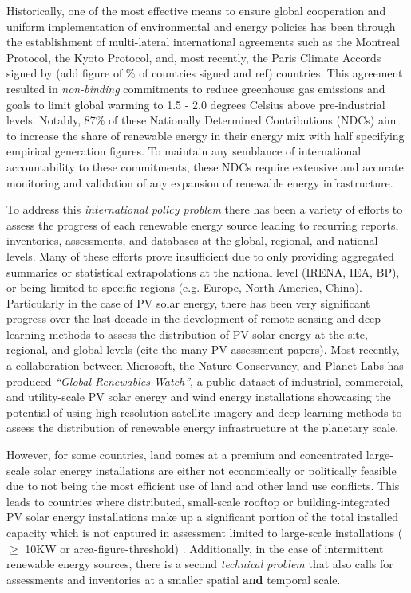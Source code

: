 \begin{multicols}{2}
Historically, one of the most effective means to ensure global cooperation and uniform implementation of environmental and energy policies has been through the establishment of multi-lateral international agreements such as the Montreal Protocol, the Kyoto Protocol, and, most recently, the Paris Climate Accords signed by (add figure of \% of countries signed and ref) countries. This agreement resulted in \textit{non-binding} commitments to reduce greenhouse gas emissions and goals to 
limit global warming to 1.5 - 2.0 degrees Celsius above pre-industrial levels. Notably, 87\% of these Nationally Determined Contributions (NDCs) aim to increase the share of renewable energy in their energy mix with half specifying empirical generation figures\cite{robinson_ms_planet_global_renewables_watch_2025}. To maintain any semblance of international accountability to these commitments, these NDCs require extensive and accurate monitoring and validation of any expansion of renewable energy infrastructure. 

To address this \textit{international policy problem} there has been a variety of efforts to assess the progress of each renewable energy source leading to recurring reports, inventories, assessments, and databases at the global, regional, and national levels. Many of these efforts prove insufficient due to only providing aggregated summaries or statistical extrapolations at the national level (IRENA, IEA, BP), or being limited to specific regions (e.g. Europe, North America, China). Particularly in the case of PV solar energy, there has been very significant progress over the last decade in the development of remote sensing and deep learning methods to assess the distribution of PV solar energy at the site, regional, and global levels (cite the many PV assessment papers).
Most recently, a collaboration between Microsoft, the Nature Conservancy, and Planet Labs has produced \textit{``Global Renewables Watch''}, a public dataset of industrial, commercial, and utility-scale PV solar energy and wind energy installations
showcasing the potential of using high-resolution satellite imagery and deep learning methods to assess the distribution of renewable energy infrastructure at the planetary scale. 

However, for some countries, land comes at a premium and concentrated large-scale solar energy installations are either not economically or politically feasible due to not being the most efficient use of land and other land use conflicts.
This leads to countries where distributed, small-scale rooftop or building-integrated PV solar energy installations make up a significant portion of the total installed capacity which is not captured in assessment limited to large-scale installations 
($\ge$ 10KW or area-figure-threshold) \cite{robinson_ms_planet_global_renewables_watch_2025}\cite{kruitwagen_global_inventory_pv_units_2021}. Additionally, in the case of intermittent renewable energy sources, there is a second \textit{technical problem} that also calls for assessments and inventories at a smaller spatial \textbf{and} temporal scale. 


\end{multicols}
